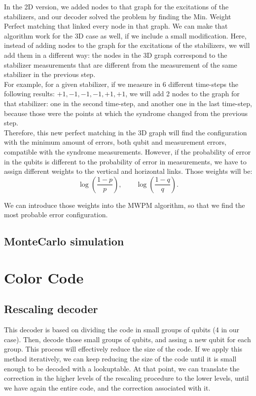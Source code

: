 \documentclass[a4paper,12pt]{article}
\begin{document}
In the 2D version, we added nodes to that graph for the excitations of the stabilizers, and our decoder solved the problem by finding the Min. Weight Perfect matching that linked every node in that graph. We can make that algorithm work for the 3D case as well, if we include a small modification. Here, instead of adding nodes to the graph for the excitations of the stabilizers, we will add them in a different way: the nodes in the 3D graph correspond to the stabilizer measurements that are different from the measurement of the same stabilizer in the previous step.\\
For example, for a given stabilizer, if we measure in 6 different time-steps the following results: $+1,-1,-1,-1,+1,+1$, we will add 2 nodes to the graph for that stabilizer: one in the second time-step, and another one in the last time-step, because those were the points at which the syndrome changed from the previous step.\\

Therefore, this new perfect matching in the 3D graph will find the configuration with the minimum amount of errors, both qubit and measurement errors, compatible with the syndrome measurements. However, if the probability of error in the qubits is different to the probability of error in measurements, we have to assign different weights to the vertical and horizontal links. Those weights will be:
$$\log\left(\frac{1-p}{p}\right),\quad\quad \log\left(\frac{1-q}{q}\right).$$

We can introduce those weights into the MWPM algorithm, so that we find the most probable error configuration.
\subsection{MonteCarlo simulation}
\newpage

\section{Color Code}
\subsection{Rescaling decoder}
This decoder is based on dividing the code in small groups of qubits (4 in our case). Then, decode those small groups of qubits, and assing a new qubit for each group. This process will effectively reduce the size of the code. If we apply this method iteratively, we can keep reducing the size of the code until it is small enough to be decoded with a lookuptable. At that point, we can translate the correction in the higher levels of the rescaling procedure to the lower levels, until we have again the entire code, and the correction associated with it.
\end{document}

